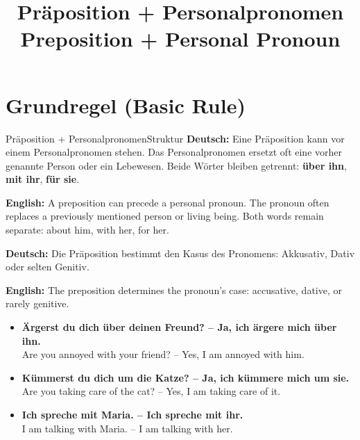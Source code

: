 \documentclass[a4paper,11pt]{article}
\title{Präposition + Personalpronomen\\{\large Preposition + Personal Pronoun}}
\date{}
\newcommand{\GermanText}[1]{\textbf{Deutsch: }#1\par}
\newcommand{\EnglishText}[1]{{\small\color{SoftGray}\textbf{English: }#1\par}}
\newcommand{\ExampleItem}[2]{\item \textbf{#1}\\{\small\color{SoftGray}#2}}
\begin{document}
\maketitle
\tableofcontents
\newpage
\section{Grundregel (Basic Rule)}
\begin{grammarentry}{Präposition + Personalpronomen}{Struktur}
\GermanText{Eine Präposition kann vor einem Personalpronomen stehen. Das Personalpronomen ersetzt oft eine vorher genannte Person oder ein Lebewesen. Beide Wörter bleiben getrennt: \textbf{über ihn}, \textbf{mit ihr}, \textbf{für sie}.}
\EnglishText{A preposition can precede a personal pronoun. The pronoun often replaces a previously mentioned person or living being. Both words remain separate: about him, with her, for her.}
\GermanText{Die Präposition bestimmt den Kasus des Pronomens: Akkusativ, Dativ oder selten Genitiv.}
\EnglishText{The preposition determines the pronoun's case: accusative, dative, or rarely genitive.}
\end{grammarentry}
\begin{exbox}\begin{itemize}
\ExampleItem{Ärgerst du dich über deinen Freund? -- Ja, ich ärgere mich über ihn.}{Are you annoyed with your friend? -- Yes, I am annoyed with him.}
\ExampleItem{Kümmerst du dich um die Katze? -- Ja, ich kümmere mich um sie.}{Are you taking care of the cat? -- Yes, I am taking care of it.}
\ExampleItem{Ich spreche mit Maria. -- Ich spreche mit ihr.}{I am talking with Maria. -- I am talking with her.}
\end{itemize}\end{exbox}
\end{document}
